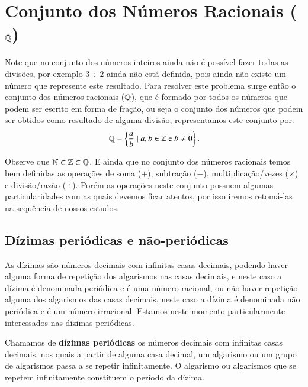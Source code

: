 \section{Conjunto dos Números Racionais (\texorpdfstring{$\mathbb{Q}$}{Q})}

Note que no conjunto dos números inteiros ainda não é possível fazer todas as divisões, por exemplo $3 \div 2$ ainda não está definida, pois ainda não existe um número que represente este resultado. Para resolver este problema surge então o conjunto dos números racionais ($\mathbb{Q}$), que é formado por todos os números que podem ser escrito em forma de fração, ou seja o conjunto dos números que podem ser obtidos como resultado de alguma divisão, representamos este conjunto por:
\[\mathbb{Q}= \left\{ \frac{a}{b} \mid a, b \in \mathbb{Z} \text{ e } b \neq 0 \right\}.\]

Observe que $\mathbb{N} \subset \mathbb{Z} \subset \mathbb{Q}$. E ainda que no conjunto dos números racionais temos bem definidas as operações de soma ($+$), subtração ($-$), multiplicação/vezes ($\times$) e divisão/razão ($\div$). Porém as operações neste conjunto possuem algumas particularidades com as quais devemos ficar atentos, por isso iremos retomá-las na sequência de nossos estudos.

\subsection{Dízimas periódicas e não-periódicas}

As dízimas são números decimais com infinitas casas decimais, podendo haver alguma forma de repetição dos algarismos nas casas decimais, e neste caso a dízima é denominada periódica e é uma número racional, ou não haver repetição alguma dos algarismos das casas decimais, neste caso a dízima é denominada não periódica e é um número irracional. Estamos neste momento particularmente interessados nas dízimas periódicas.

 \vskip0.3cm
 \colorbox{azul}{
 \begin{minipage}{0.9\linewidth}
 \begin{center}
  Chamamos de \textbf{dízimas periódicas} os números decimais com infinitas casas decimais, nos quais a partir de alguma casa decimal, um algarismo ou um grupo de algarismos passa a se repetir infinitamente. O algarismo ou algarismos que se repetem infinitamente constituem o período da dízima.
 \end{center}
 \end{minipage}}
 \vskip0.3cm

